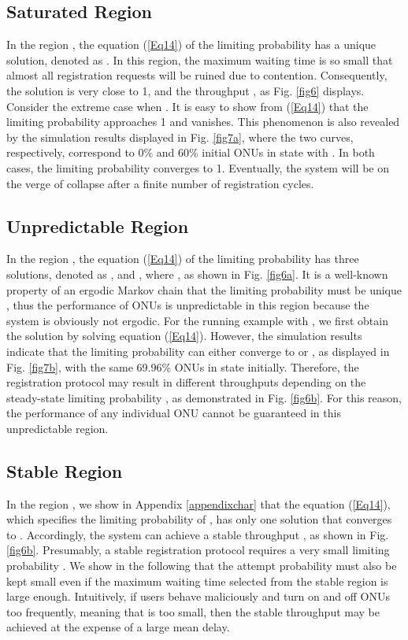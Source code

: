 \documentclass[journal]{IEEEtran}
\begin{document}
\subsection{Saturated Region}\label{subsection3A}
In the region , the equation (\ref{Eq14}) of the limiting probability  has a unique solution, denoted as . In this region, the maximum waiting time  is so small that almost all registration requests will be ruined due to contention. Consequently, the solution  is very close to 1, and the throughput , as Fig. \ref{fig6} displays. Consider the extreme case when . It is easy to show from (\ref{Eq14}) that the limiting probability  approaches 1 and  vanishes. This phenomenon is also revealed by the simulation results displayed in Fig. \ref{fig7a}, where the two curves, respectively, correspond to 0\% and 60\% initial ONUs in state  with . In both cases, the limiting probability  converges to 1. Eventually, the system will be on the verge of collapse after a finite number of registration cycles.

\subsection{Unpredictable Region}\label{subsection3B}
In the region , the equation (\ref{Eq14}) of the limiting probability  has three solutions, denoted as ,  and , where , as shown in Fig. \ref{fig6a}. It is a well-known property of an ergodic Markov chain that the limiting probability must be unique \cite{18ross2006introduction,19borovkov1998ergodicity}, thus the performance of ONUs is unpredictable in this region because the system is obviously not ergodic. For the running example with , we first obtain the solution  by solving equation (\ref{Eq14}). However, the simulation results indicate that the limiting probability  can either converge to  or , as displayed in Fig. \ref{fig7b}, with the same 69.96\% ONUs in state  initially. Therefore, the registration protocol may result in different throughputs depending on the steady-state limiting probability , as demonstrated in Fig. \ref{fig6b}. For this reason, the performance of any individual ONU cannot be guaranteed in this unpredictable region.

\subsection{Stable Region}\label{subsection3C}
In the region , we show in Appendix \ref{appendixchar} that the equation (\ref{Eq14}), which specifies the limiting probability of , has only one solution that converges to . Accordingly, the system can achieve a stable throughput , as shown in Fig. \ref{fig6b}. Presumably, a stable registration protocol requires a very small limiting probability . We show in the following that the attempt probability  must also be kept small even if the maximum waiting time selected from the stable region  is large enough. Intuitively, if users behave maliciously and turn on and off ONUs too frequently, meaning that  is too small, then the stable throughput may be achieved at the expense of a large mean delay.
\end{document}
